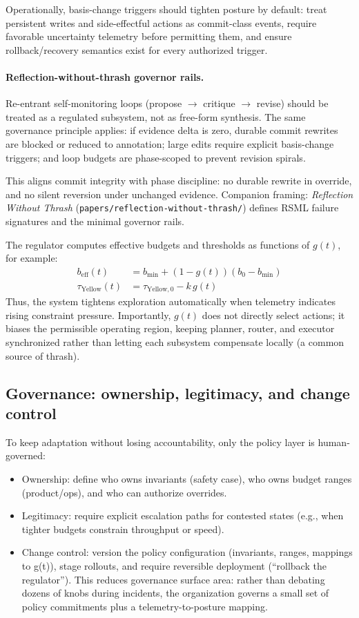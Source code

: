 \documentclass[11pt]{article}
\begin{document}
Operationally, basis-change triggers should tighten posture by default:
treat persistent writes and side-effectful actions as commit-class events, require favorable uncertainty telemetry before permitting them, and ensure rollback/recovery semantics exist for every authorized trigger.

\paragraph{Reflection-without-thrash governor rails.}
Re-entrant self-monitoring loops (propose \(\rightarrow\) critique \(\rightarrow\) revise) should be treated as a regulated subsystem, not as free-form synthesis. The same governance principle applies: if evidence delta is zero, durable commit rewrites are blocked or reduced to annotation; large edits require explicit basis-change triggers; and loop budgets are phase-scoped to prevent revision spirals.

This aligns commit integrity with phase discipline: no durable rewrite in override, and no silent reversion under unchanged evidence. Companion framing: \emph{Reflection Without Thrash} (\texttt{papers/reflection-without-thrash/}) defines RSML failure signatures and the minimal governor rails.

The regulator computes effective budgets and thresholds as functions of $g(t)$, for example:
\begin{align}
b_{\mathrm{eff}}(t) &= b_{\min} + (1-g(t))(b_0-b_{\min})\\
\tau_{\mathrm{Yellow}}(t) &= \tau_{\mathrm{Yellow},0} - k\,g(t)
\end{align}
Thus, the system tightens exploration automatically when telemetry indicates rising constraint pressure. Importantly, $g(t)$ does not directly select actions; it biases the permissible operating region, keeping planner, router, and executor synchronized rather than letting each subsystem compensate locally (a common source of thrash).

\subsection{Governance: ownership, legitimacy, and change control}
To keep adaptation without losing accountability, only the policy layer is human-governed:
\begin{itemize}
\item 
Ownership: define who owns invariants (safety case), who owns budget ranges (product/ops),
and who can authorize overrides.
\item 
Legitimacy: require explicit escalation paths for contested states (e.g., when tighter budgets
constrain throughput or speed).
\item 
Change control: version the policy configuration (invariants, ranges, mappings to g(t)), stage
rollouts, and require reversible deployment (“rollback the regulator”).
This reduces governance surface area: rather than debating dozens of knobs during incidents, the
organization governs a small set of policy commitments plus a telemetry-to-posture mapping.
\end{itemize}
\end{document}
